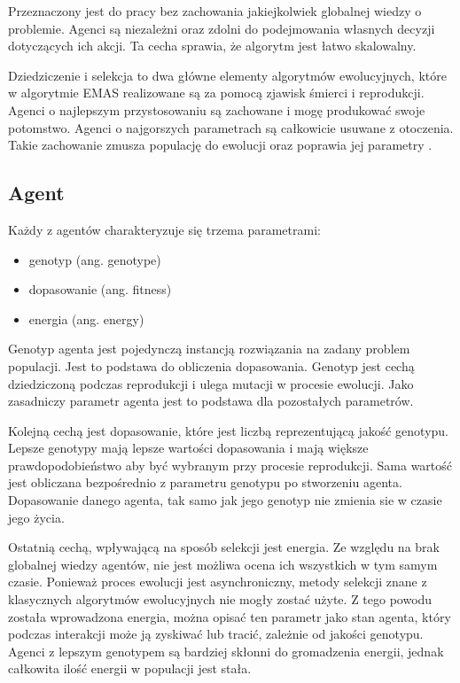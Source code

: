 Przeznaczony jest do pracy bez zachowania jakiejkolwiek globalnej wiedzy o problemie. Agenci są niezależni oraz zdolni do podejmowania własnych decyzji dotyczących ich akcji. Ta cecha sprawia, że algorytm jest łatwo skalowalny. 

Dziedziczenie i selekcja to dwa główne elementy algorytmów ewolucyjnych, które w algorytmie EMAS realizowane są za pomocą zjawisk śmierci i reprodukcji. Agenci o najlepszym przystosowaniu są zachowane i mogę produkować swoje potomstwo. Agenci o najgorszych parametrach są całkowicie usuwane z otoczenia. Takie zachowanie zmusza populację do ewolucji oraz poprawia jej parametry \cite{emas2}.

\subsection{Agent}
\label{sec:agentgenetyczny}
Każdy z agentów charakteryzuje się trzema parametrami:
\begin {itemize}
\item genotyp (ang. genotype)
\item dopasowanie (ang. fitness)
\item energia (ang. energy)
\end {itemize}
Genotyp agenta jest pojedynczą instancją rozwiązania na zadany problem populacji. Jest to podstawa do obliczenia dopasowania. Genotyp jest cechą dziedziczoną podczas reprodukcji i ulega mutacji w procesie ewolucji. Jako zasadniczy parametr agenta jest to podstawa dla pozostałych parametrów.

Kolejną cechą jest dopasowanie, które jest liczbą reprezentującą jakość genotypu. Lepsze genotypy mają lepsze wartości dopasowania i mają większe prawdopodobieństwo aby być wybranym przy procesie reprodukcji. Sama wartość jest obliczana bezpośrednio z parametru genotypu po stworzeniu agenta. Dopasowanie danego agenta, tak samo jak jego genotyp nie zmienia sie w czasie jego życia.

Ostatnią cechą, wpływającą na sposób selekcji jest energia. Ze względu na brak globalnej wiedzy agentów, nie jest możliwa ocena ich wszystkich w tym samym czasie. Ponieważ proces ewolucji jest asynchroniczny, metody selekcji znane z klasycznych algorytmów ewolucyjnych nie mogły zostać użyte. Z tego powodu została wprowadzona energia, można opisać ten parametr jako stan agenta, który podczas interakcji może ją zyskiwać lub tracić, zależnie od jakości genotypu. Agenci z lepszym genotypem są bardziej skłonni do gromadzenia energii, jednak całkowita ilość energii w populacji jest stała.

